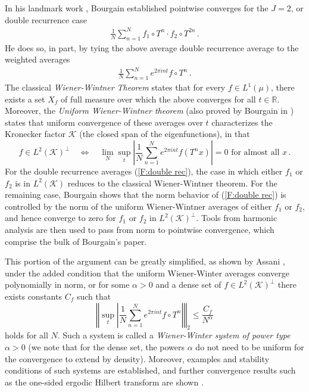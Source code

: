 \documentclass[11pt, oneside]{amsart}   	%
\newcommand{\R}{\mathbb{R}}
\newcommand{\K}{\mathcal{K}}
\newcommand{\1}{\mathbbm{1}}
\theoremstyle{definition}
\begin{document}
In his landmark work \cite{Bourgain}, Bourgain established pointwise converges for the $J=2$, or double recurrence case
\begin{align}\label{F:double rec}
\frac{1}{N}\sum_{n=1}^N f_1\circ T^n \cdot f_2 \circ T^{2n} \, .
\end{align}
He does so, in part, by tying the above average double recurrence average to the weighted averages
\begin{align}\label{F:WW av}
\frac{1}{N}\sum_{n=1}^N e^{2\pi i n t} f\circ T^n \, .
\end{align}
The classical \textit{Wiener-Wintner Theorem} \cite{WW} states that for every $f\in L^1(\mu)$, there exists a set $X_f$ of full measure over which the above converges for all $t\in \R$. Moreover, the \textit{Uniform Wiener-Wintner theorem} (also proved by Bourgain in \cite{Bourgain}) states that uniform convergence of these averages over $t$ characterizes the Kronecker factor $\mathcal{K}$ (the closed span of the eigenfunctions), in that
$$f\in L^2(\K)^\perp \quad \iff \quad \lim_N \sup_t \left| \frac{1}{N}\sum_{n=1}^N e^{2\pi i n t} f(T^n x) \right|= 0 \text{ for almost all }x \, .$$
For the double recurrence averages (\ref{F:double rec}), the case in which either $f_1$ or $f_2$ is in $L^2(\mathcal{K})$ reduces to the classical Wiener-Wintner theorem. For the remaining case, Bourgain shows that the norm behavior of (\ref{F:double rec}) is controlled by the norm of the uniform Wiener-Wintner averages of either $f_1$ or $f_2$, and hence converge to zero for $f_1$ or $f_2$ in  $L^2(\mathcal{K})^\perp$. Tools from harmonic analysis are then used to pass from norm to pointwise convergence, which comprise the bulk of Bourgain's paper.

This portion of the argument can be greatly simplified, as shown by Assani \cite{assani}, under the added condition that the uniform Wiener-Winter averages converge polynomially in norm, or for some $\alpha>0$ and a dense set of $f\in L^2(\mathcal{K})^\perp$ there exists constants $C_f$ such that
$$\left\Vert\sup_t \left| \frac{1}{N}\sum_{n=1}^N e^{2\pi i n t} f \circ T^n \right|\right\Vert_2 \leq \frac{C_f}{N^\alpha}$$
holds for all $N$. Such a system is called a \textit{Wiener-Winter system of power type $\alpha > 0$} (we note that for the dense set, the powers $\alpha$ do not need to be uniform for the convergence to extend by density). Moreover, examples and stability conditions of such systems are established, and further convergence results such as the one-sided ergodic Hilbert transform are shown \cite{assani04}. 
\end{document}
